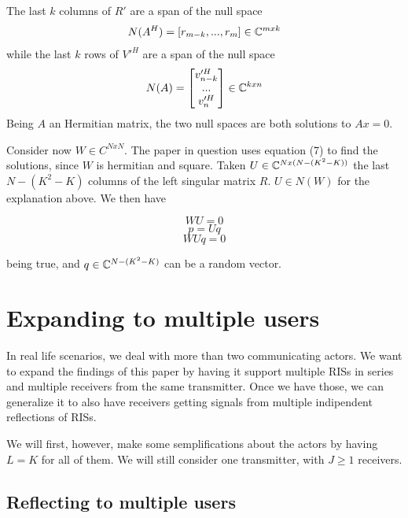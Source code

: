The last $k$ columns of $R'$ are a span of the null space
\begin{equation}
  N(A^H) = [r_{m-k}, ..., r_m ] \in \mathbb{C}^{mxk}
\end{equation}
while the last $k$ rows of $V'^H$ are a span of the null space
\begin{equation}
  N(A) = \begin{bmatrix} v'^H_{n-k} \\ ... \\ v'^H_n \end{bmatrix} \in \mathbb{C}^{kxn}
\end{equation}
Being $A$ an Hermitian matrix, the two null spaces are both solutions to $Ax = 0$.

Consider now $W \in C^{NxN}$. The paper in question uses equation (7) to find the solutions, since $W$ is hermitian and square. Taken $U \in \mathbb{C} ^ {Nx(N-(K^2 - K))}$ the last $N-(K^2 - K)$ columns of the left singular matrix $R$. $U \in N(W)$ for the explanation above. We then have

\begin{equation}WU = 0\end{equation}
\begin{equation}p = Uq\end{equation}
\begin{equation}WUq = 0\end{equation}

being true, and $q \in \mathbb{C}^{N-(K^2 - K)}$ can be a random vector.

\section{Expanding to multiple users}

In real life scenarios, we deal with more than two communicating actors. We want to expand the findings of this paper by having it support multiple RISs in series and multiple receivers from the same transmitter. Once we have those, we can generalize it to also have receivers getting signals from multiple indipendent reflections of RISs.

We will first, however, make some semplifications about the actors by having $L = K$ for all of them. We will still consider one transmitter, with $J \ge 1$ receivers.

\subsection{Reflecting to multiple users}

